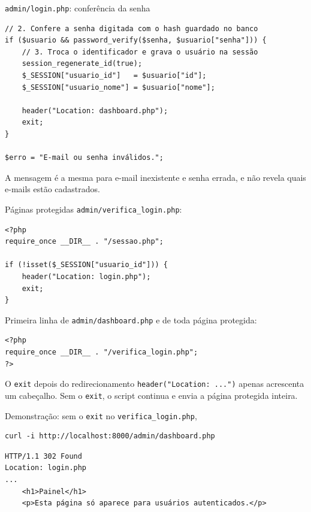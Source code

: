 \documentclass{beamer}
\begin{document}
\begin{frame}[fragile]{\texttt{admin/login.php}: conferência da senha}
	\begin{verbatim}
// 2. Confere a senha digitada com o hash guardado no banco
if ($usuario && password_verify($senha, $usuario["senha"])) {
    // 3. Troca o identificador e grava o usuário na sessão
    session_regenerate_id(true);
    $_SESSION["usuario_id"]   = $usuario["id"];
    $_SESSION["usuario_nome"] = $usuario["nome"];

    header("Location: dashboard.php");
    exit;
}

$erro = "E-mail ou senha inválidos.";
	\end{verbatim}

	A mensagem é a mesma para e-mail inexistente e senha errada, e não revela
	quais e-mails estão cadastrados.
\end{frame}

\begin{frame}[fragile]{Páginas protegidas}
	\texttt{admin/verifica\_login.php}:
	\begin{verbatim}
<?php
require_once __DIR__ . "/sessao.php";

if (!isset($_SESSION["usuario_id"])) {
    header("Location: login.php");
    exit;
}
	\end{verbatim}

	Primeira linha de \texttt{admin/dashboard.php} e de toda página protegida:
	\begin{verbatim}
<?php
require_once __DIR__ . "/verifica_login.php";
?>
	\end{verbatim}
\end{frame}

\begin{frame}[fragile]{O \texttt{exit} depois do redirecionamento}
	\texttt{header("Location: ...")} apenas acrescenta um cabeçalho. Sem o
	\texttt{exit}, o script continua e envia a página protegida inteira.

	\vspace{0.2cm}
	Demonstração: sem o \texttt{exit} no \texttt{verifica\_login.php},

	\begin{verbatim}
curl -i http://localhost:8000/admin/dashboard.php
	\end{verbatim}

	\begin{verbatim}
HTTP/1.1 302 Found
Location: login.php
...
    <h1>Painel</h1>
    <p>Esta página só aparece para usuários autenticados.</p>
	\end{verbatim}
\end{frame}
\end{document}
